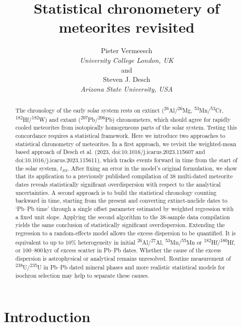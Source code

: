 \documentclass{article}
\title{Statistical chronometery of meteorites revisited}
\author{Pieter Vermeesch\\\emph{University College London, UK}\\
  and\\
Steven J. Desch\\\emph{Arizona State University, USA}}
\begin{document}
\linenumbers
\maketitle

\begin{abstract}
  The chronology of the early solar system rests on extinct
  (\textsuperscript{26}Al/\textsuperscript{26}Mg,
  \textsuperscript{53}Mn/\textsuperscript{53}Cr,
  \textsuperscript{182}Hf/\textsuperscript{182}W) and extant
  (\textsuperscript{207}Pb/\textsuperscript{206}Pb) chronometers,
  which should agree for rapidly cooled meteorites from isotopically
  homogeneous parts of the solar system. Testing this concordance
  requires a statistical framework. Here we introduce two approaches
  to statistical chronometry of meteorites.  In a first approach, we
  revisit the weighted-mean based approach of Desch et al. (2023,
  doi:10.1016/j.icarus.2023.115607 and
  doi:10.1016/j.icarus.2023.115611), which tracks events forward in
  time from the start of the solar system, $t_{\mathit{SS}}$.  After
  fixing an error in the model's original formulation, we show that
  its application to a previously published compilation of 38
  multi-dated meteorite dates reveals statistically significant
  overdispersion with respect to the analytical uncertainties.  A
  second approach is to build the statistical chronology counting
  backward in time, starting from the present and converting
  extinct-nuclide dates to `Pb--Pb time' through a single offset
  parameter estimated by weighted regression with a fixed unit
  slope. Applying the second algorithm to the 38-sample data
  compilation yields the same conclusion of statistically significant
  overdispersion. Extending the regression to a random-effects model
  allows the excess dispersion to be quantified. It is equivalent to
  up to 10\% heterogeneity in initial
  \textsuperscript{26}Al/\textsuperscript{27}Al,
  \textsuperscript{53}Mn/\textsuperscript{55}Mn or
  \textsuperscript{182}Hf/\textsuperscript{180}Hf, or 100--800\,kyr of
  excess scatter in Pb--Pb dates.  Whether the cause of the excess
  dispersion is astrophysical or analytical remains
  unresolved. Routine measurement of
  \textsuperscript{238}U/\textsuperscript{235}U in Pb--Pb dated
  mineral phases and more realistic statistical models for isochron
  selection may help to separate these causes.
\end{abstract}

\section{Introduction}
\label{sec:intro}
\end{document}
